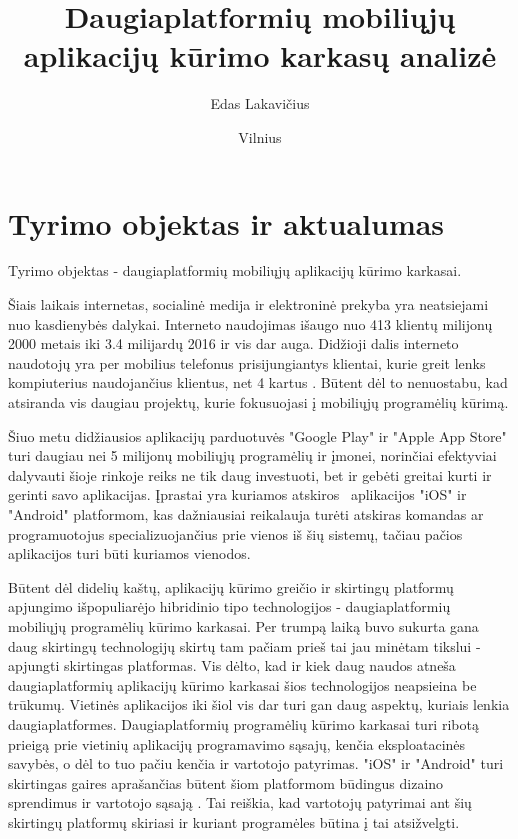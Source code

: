 \documentclass{VUMIFInfBakalaurinis}
\title{Daugiaplatformių mobiliųjų aplikacijų kūrimo karkasų analizė}
\author{Edas Lakavičius}
\date{Vilnius \\ \the\year}
\begin{document}
\maketitle

\tableofcontents

\section{Tyrimo objektas ir aktualumas}
Tyrimo objektas - daugiaplatformių mobiliųjų aplikacijų kūrimo karkasai.

Šiais laikais internetas, socialinė medija ir elektroninė prekyba yra neatsiejami nuo kasdienybės dalykai.
Interneto naudojimas išaugo nuo 413 klientų milijonų 2000 metais iki 3.4 milijardų 2016 \cite{owidinternet}
ir vis dar auga. Didžioji dalis interneto naudotojų yra per mobilius telefonus prisijungiantys klientai,
kurie greit lenks kompiuterius naudojančius klientus, net 4 kartus \cite{internetusage}. Būtent dėl to
nenuostabu, kad atsiranda vis daugiau projektų, kurie fokusuojasi į mobiliųjų programėlių kūrimą.

Šiuo metu didžiausios aplikacijų parduotuvės "Google Play" ir "Apple App Store" turi daugiau nei 5 milijonų
mobiliųjų programėlių \cite{appcount} ir įmonei, norinčiai efektyviai dalyvauti šioje rinkoje reiks ne tik
daug investuoti, bet ir gebėti greitai kurti ir gerinti savo aplikacijas. Įprastai yra kuriamos atskiros \
aplikacijos "iOS" ir "Android" platformom, kas dažniausiai reikalauja turėti atskiras komandas ar
programuotojus specializuojančius prie vienos iš šių sistemų, tačiau pačios aplikacijos turi būti kuriamos
vienodos.

Būtent dėl didelių kaštų, aplikacijų kūrimo greičio ir skirtingų platformų apjungimo išpopuliarėjo hibridinio
tipo technologijos - daugiaplatformių mobiliųjų programėlių kūrimo karkasai. Per trumpą laiką buvo sukurta
gana daug skirtingų technologijų skirtų tam pačiam prieš tai jau minėtam tikslui - apjungti skirtingas
platformas. Vis dėlto, kad ir kiek daug naudos atneša daugiaplatformių aplikacijų kūrimo karkasai šios technologijos neapsieina be trūkumų.
Vietinės aplikacijos iki šiol vis dar turi gan daug aspektų, kuriais lenkia daugiaplatformes. Daugiaplatformių programėlių kūrimo karkasai
turi ribotą prieigą prie vietinių aplikacijų programavimo sąsajų, kenčia eksploatacinės savybės, o dėl to tuo
pačiu kenčia ir vartotojo patyrimas. "iOS" ir "Android" turi skirtingas gaires aprašančias būtent šiom platformom būdingus
dizaino sprendimus ir vartotojo sąsają \cite{androidui iosui}. Tai reiškia, kad vartotojų patyrimai ant šių skirtingų platformų
skiriasi ir kuriant programėles būtina į tai atsižvelgti.
\end{document}
